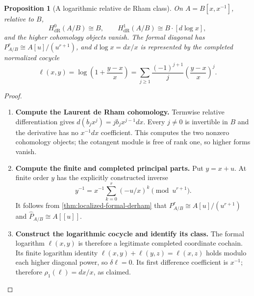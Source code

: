 \documentclass[11pt,a4paper]{article}
\numberwithin{algorithm}{section}
\numberwithin{equation}{section}
\newtheorem{proposition}[proposition]{Proposition}
\theoremstyle{definition}
\theoremstyle{remark}
\theoremstyle{plain}
\theoremstyle{definition}
\theoremstyle{plain}
\begin{document}
\begin{proposition}[A logarithmic relative de Rham class]
\label{prop:logarithmic-derham}
On $A=B[x,x^{-1}]$, relative to $B$,
\[
 H^0_{\mathrm{dR}}(A/B)\cong B,\qquad
 H^1_{\mathrm{dR}}(A/B)\cong B\cdot[d\log x],
\]
and the higher cohomology objects vanish.  The formal diagonal
has $P^r_{A/B}\cong A[u]/(u^{r+1})$, and $d\log x=dx/x$
is represented by the completed normalized cocycle
\[
 \ell(x,y)=\log\left(1+\frac{y-x}{x}\right)
 =\sum_{j\ge1}\frac{(-1)^{j+1}}j
       \left(\frac{y-x}{x}\right)^j.
\]
\end{proposition}
\begin{proof}\leavevmode
\begin{enumerate}[leftmargin=*,align=left]
\item \textbf{Compute the Laurent de Rham cohomology.}
Termwise relative differentiation gives
$d(b_jx^j)=jb_jx^{j-1}dx$.  Every $j\ne0$ is invertible
in $B$ and the derivative has no $x^{-1}dx$ coefficient.
This computes the two nonzero cohomology objects; the
cotangent module is free of rank one, so higher forms vanish.

\item \textbf{Compute the finite and completed principal parts.}
Put $y=x+u$.  At finite order $y$ has the explicitly
constructed inverse
\[
 y^{-1}=x^{-1}\sum_{k=0}^r(-u/x)^k\pmod{u^{r+1}}.
\]
It follows from \cref{thm:localized-formal-derham} that
$P^r_{A/B}\cong A[u]/(u^{r+1})$ and
$\widehat P_{A/B}\cong A[[u]]$.

\item \textbf{Construct the logarithmic cocycle and identify its class.}
The formal logarithm
$\ell(x,y)$ is therefore a legitimate completed coordinate
cochain.  Its finite logarithm identity
$\ell(x,y)+\ell(y,z)=\ell(x,z)$ holds modulo each higher
diagonal power, so $\delta\ell=0$.  Its first difference
coefficient is $x^{-1}$; therefore
$\rho_1(\ell)=dx/x$, as claimed.
\end{enumerate}
\end{proof}
\end{document}
